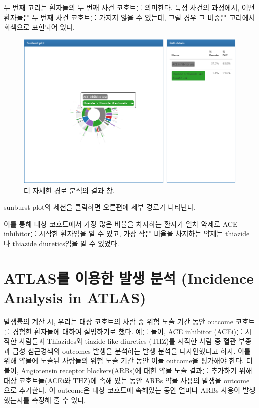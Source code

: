 \documentclass[11pt]{book}
\theoremstyle{definition}
\theoremstyle{definition}
\theoremstyle{definition}
\theoremstyle{remark}
\begin{document}
두 번째 고리는 환자들의 두 번째 사건 코호트를 의미한다. 특정 사건의
과정에서, 어떤 환자들은 두 번째 사건 코호트를 가지지 않을 수 있는데,
그럴 경우 그 비중은 고리에서 회색으로 표현되어 있다.

\begin{figure}

{\centering \includegraphics[width=1\linewidth]{images/Characterization/atlasPathwaysResultsPathDetails} 

}

\caption{더 자세한 경로 분석의 결과 창.}\label{fig:atlasPathwaysResultsPathDetails}
\end{figure}

sunburst plot의 세션을 클릭하면 오른편에 세부 경로가 나타난다.

이를 통해 대상 코호트에서 가장 많은 비율을 차지하는 환자가 일차 약제로
ACE inhibitor를 시작한 환자임을 알 수 있고, 가장 작은 비율을 차지하는
약제는 thiazide나 thiazide diuretics임을 알 수 있었다.

\section{ATLAS를 이용한 발생 분석 (Incidence Analysis in
ATLAS)}\label{atlas----incidence-analysis-in-atlas}

발생률의 계산 시, 우리는 대상 코호트의 사람 중 위험 노출 기간 동안
outcome 코호트를 경험한 환자들에 대하여 설명하기로 했다. 예를 들어, ACE
inhibitor (ACEi)를 시작한 사람들과 Thiazides와 tiazide-like diuretics
(THZ)를 시작한 사람 중 혈관 부종과 급성 심근경색의 outcomes 발생을
분석하는 발생 분석을 디자인했다고 하자. 이를 위해 약물에 노출된 사람들의
위험 노출 기간 동안 이들 outcome을 평가해야 한다. 더불어, Angiotensin
receptor blockers(ARBs)에 대한 약물 노출 결과를 추가하기 위해 대상
코호트들(ACEi와 THZ)에 속해 있는 동안 ARBs 약물 사용의 발생을
outcome으로 추가한다. 이 outcome은 대상 코호트에 속해있는 동안 얼마나
ARBs 사용이 발생했는지를 측정해 줄 수 있다.
\end{document}
